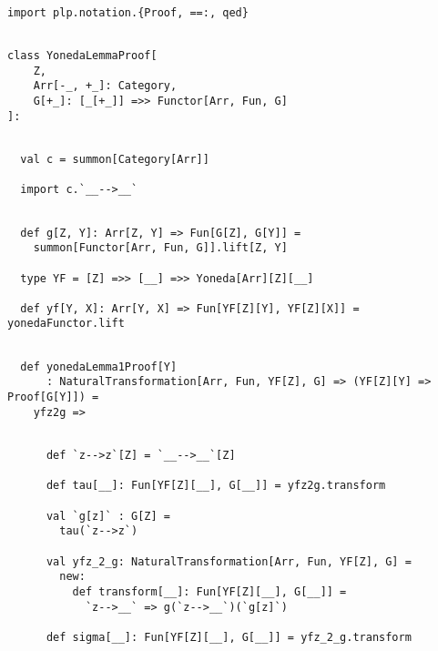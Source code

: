 \documentclass[11pt]{article}
\begin{document}
\vspace{6pt}
\begin{mdframed}[backgroundcolor=lightgray!20] 
\begin{lstlisting}

import plp.notation.{Proof, ==:, qed}
\end{lstlisting}
\end{mdframed}
\vspace{6pt}
\begin{mdframed}[backgroundcolor=lightgray!20] 
\begin{lstlisting}

class YonedaLemmaProof[
    Z,
    Arr[-_, +_]: Category,
    G[+_]: [_[+_]] =>> Functor[Arr, Fun, G]
]:
\end{lstlisting}
\end{mdframed}
\vspace{6pt}
\begin{mdframed}[backgroundcolor=lightgray!20] 
\begin{lstlisting}

  val c = summon[Category[Arr]]

  import c.`__-->__`
\end{lstlisting}
\end{mdframed}
\vspace{6pt}
\begin{mdframed}[backgroundcolor=lightgray!20] 
\begin{lstlisting}

  def g[Z, Y]: Arr[Z, Y] => Fun[G[Z], G[Y]] =
    summon[Functor[Arr, Fun, G]].lift[Z, Y]

  type YF = [Z] =>> [__] =>> Yoneda[Arr][Z][__]

  def yf[Y, X]: Arr[Y, X] => Fun[YF[Z][Y], YF[Z][X]] = yonedaFunctor.lift
\end{lstlisting}
\end{mdframed}
\vspace{6pt}
\begin{mdframed}[backgroundcolor=lightgray!20] 
\begin{lstlisting}

  def yonedaLemma1Proof[Y]
      : NaturalTransformation[Arr, Fun, YF[Z], G] => (YF[Z][Y] => Proof[G[Y]]) =
    yfz2g =>
\end{lstlisting}
\end{mdframed}
\vspace{6pt}
\clearpage
\begin{mdframed}[backgroundcolor=lightgray!20] 
\begin{lstlisting}
  
      def `z-->z`[Z] = `__-->__`[Z]

      def tau[__]: Fun[YF[Z][__], G[__]] = yfz2g.transform

      val `g[z]` : G[Z] =
        tau(`z-->z`)

      val yfz_2_g: NaturalTransformation[Arr, Fun, YF[Z], G] =
        new:
          def transform[__]: Fun[YF[Z][__], G[__]] =
            `z-->__` => g(`z-->__`)(`g[z]`)

      def sigma[__]: Fun[YF[Z][__], G[__]] = yfz_2_g.transform
\end{lstlisting}
\end{mdframed}
\end{document}
